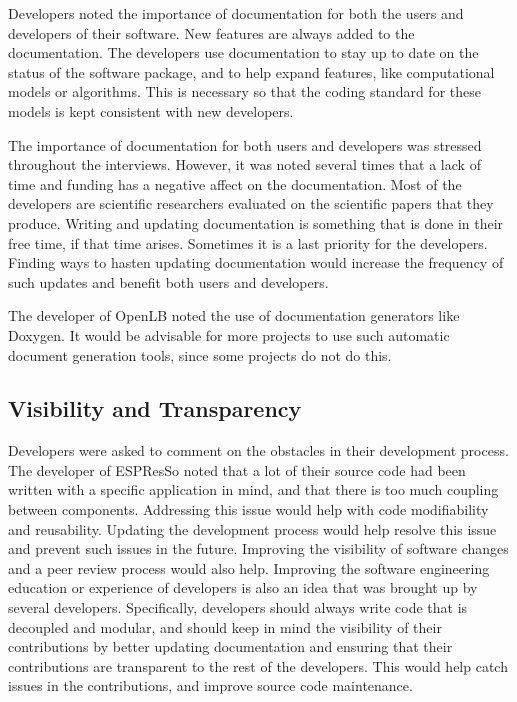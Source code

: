 \documentclass[12pt, notitlepage]{article}
\begin{document}
Developers noted the importance of documentation for both the users and developers of their software. New features are always added to the documentation. The developers use documentation to stay up to date on the status of the software package, and to help expand features, like computational models or algorithms. This is necessary so that the coding standard for these models is kept consistent with new developers.

The importance of documentation for both users and developers was stressed throughout the interviews. However, it was noted several times that a lack of time and funding has a negative affect on the documentation. Most of the developers are scientific researchers evaluated on the scientific papers that they produce. Writing and updating documentation is something that is done in their free time, if that time arises. Sometimes it is a last priority for the developers. Finding ways to hasten updating documentation would increase the frequency of such updates and benefit both users and developers. 

The developer of OpenLB noted the use of documentation generators like Doxygen. It would be advisable for more projects to use such automatic document generation tools, since some projects do not do this.  

\subsection{Visibility and Transparency}

Developers were asked to comment on the obstacles in their development process. The developer of ESPResSo noted that a lot of their source code had been written with a specific application in mind, and that there is too much coupling between components. Addressing this issue would help with code modifiability and reusability. Updating the development process would help resolve this issue and prevent such issues in the future. Improving the visibility of software changes and a peer review process would also help. Improving the software engineering education or experience of developers is also an idea that was brought up by several developers. Specifically, developers should always write code that is decoupled and modular, and should keep in mind the visibility of their contributions by better updating documentation and ensuring that their contributions are transparent to the rest of the developers. This would help catch issues in the contributions, and improve source code maintenance.   
\end{document}
